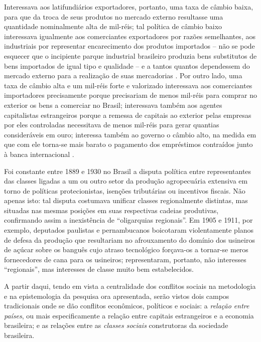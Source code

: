 Interessava aos latifundiários exportadores, portanto, uma taxa de câmbio baixa, para que da troca de seus produtos no mercado externo resultasse uma quantidade nominalmente alta de mil-réis; tal política de câmbio baixo interessava igualmente aos comerciantes exportadores por razões semelhantes, aos industriais por representar encarecimento dos produtos importados -- não se pode esquecer que o incipiente parque industrial brasileiro produzia bens substitutos de bens importados de igual tipo e qualidade -- e a tantos quantos dependessem do mercado externo para a realização de suas mercadorias \cite[p.~100]{CARONE1970inst}. Por outro lado, uma taxa de câmbio alta e um mil-réis forte e valorizado interessava aos comerciantes importadores precisamente porque precisariam de menos mil-réis para comprar no exterior os bens a comerciar no Brasil; interessava também aos agentes capitalistas estrangeiros porque a remessa de capitais ao exterior pelas empresas por eles controladas necessitava de menos mil-réis para gerar quantias consideráveis em ouro; interessa também ao governo o câmbio alto, na medida em que com ele torna-se mais barato o pagamento dos empréstimos contraídos junto à banca internacional \cite[p.~100-101]{CARONE1970inst}.

Foi constante entre 1889 e 1930 no Brasil a disputa política entre representantes das classes ligadas a um ou outro setor da produção agropecuária extensiva em torno de políticas protecionistas, isenções tributárias ou incentivos fiscais. Não apenas isto: tal disputa costumava unificar classes regionalmente distintas, mas situadas nas mesmas posições em suas respectivas cadeias produtivas, confirmando assim a inexistência de ``oligarquias regionais''. Em 1905 e 1911, por exemplo, deputados paulistas e pernambucanos boicotaram violentamente planos de defesa da produção que resultariam no afrouxamento do domínio dos usineiros de açúcar sobre os banguês cujo atraso tecnológico forçava-os a tornar-se meros fornecedores de cana para os usineiros; representaram, portanto, não interesses ``regionais'', mas interesses de classe muito bem estabelecidos. 

A partir daqui, tendo em vista a centralidade dos conflitos sociais na metodologia e na epistemologia da pesquisa ora apresentada, serão vistos dois campos tradicionais onde se dão conflitos econômicos, políticos e sociais: a \textit{relação entre países}, ou mais especificamente a relação entre capitais estrangeiros e a economia brasileira; e as relações entre as \textit{classes sociais} construtoras da sociedade brasileira.

